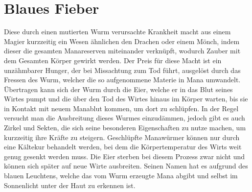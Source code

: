 \documentclass[a4paper,12pt,oneside]{book}
\begin{document}
\section{Blaues Fieber}
Diese durch einen mutierten Wurm verursachte Krankheit macht aus einem Magier kurzzeitig ein Wesen ähnlichen den Drachen oder einem Mönch, indem dieser die gesamten Manareserven miteinander verknüpft, wodurch Zauber mit dem Gesamten Körper gewirkt werden. Der Preis für diese Macht ist ein unzähmbarer Hunger, der bei Missachtung zum Tod führt, ausgelöst durch das Fressen des Wurm, welcher die so aufgenommene Materie in Mana umwandelt. Übertragen kann sich der Wurm durch die Eier, welche er in das Blut seines Wirtes pumpt und die über den Tod des Wirtes hinaus im Körper warten, bis sie in Kontakt mit neuem Manablut kommen, um dort zu schlüpfen. In der Regel versucht man die Ausbreitung dieses Wurmes einzudämmen, jedoch gibt es auch Zirkel und Sekten, die sich seine besonderen Eigenschaften zu nutze machen, um kurzzeitig ihre Kräfte zu steigern. Geschlüpfte Manawürmer können nur durch eine Kältekur behandelt werden, bei dem die Körpertemperatur des Wirts weit genug gesenkt werden muss. Die Eier sterben bei diesem Prozess zwar nicht und können sich später auf neue Wirte ausbreiten. Seinen Namen hat es aufgrund des blauen Leuchtens, welche das vom Wurm erzeugte Mana abgibt und selbst im Sonnenlicht unter der Haut zu erkennen ist.


\cleardoublepage
{}
{}
\printindex[Stichworte]
{}
\printindex[Geographie]
\end{document}
